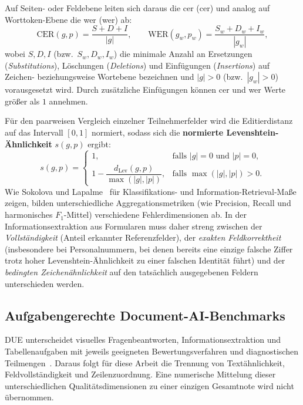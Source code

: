Auf Seiten- oder Feldebene leiten sich daraus die \acl{cer} (\ac{cer}) und analog auf Worttoken-Ebene die \acl{wer} (\ac{wer}) ab:
\begin{equation}
  \mathrm{CER}(g, p) = \frac{S + D + I}{|g|}, \qquad
  \mathrm{WER}(g_w, p_w) = \frac{S_w + D_w + I_w}{|g_w|},
  \label{eq:cer-wer}
\end{equation}
wobei $S, D, I$ (bzw.\ $S_w, D_w, I_w$) die minimale Anzahl an Ersetzungen (\emph{Substitutions}), Löschungen (\emph{Deletions}) und Einfügungen (\emph{Insertions}) auf Zeichen- beziehungsweise Wortebene bezeichnen und $|g| > 0$ (bzw.\ $|g_w| > 0$) vorausgesetzt wird. Durch zusätzliche Einfügungen können \ac{cer} und \ac{wer} Werte größer als $1$ annehmen.

Für den paarweisen Vergleich einzelner Teilnehmerfelder wird die Editierdistanz auf das Intervall $[0, 1]$ normiert, sodass sich die \textbf{normierte Levenshtein-Ähnlichkeit} $s(g, p)$ ergibt:
\begin{equation}
  s(g, p) = \begin{cases}
    1, & \text{falls } |g| = 0 \text{ und } |p| = 0, \\[4pt]
    1 - \dfrac{d_{\mathrm{Lev}}(g, p)}{\max(|g|, |p|)}, & \text{falls } \max(|g|, |p|) > 0.
  \end{cases}
  \label{eq:levenshtein-similarity}
\end{equation}
Wie Sokolova und Lapalme~\cite{Sokolova2009Measures} für Klassifikations- und Information-Retrieval-Maße zeigen, bilden unterschiedliche Aggregationsmetriken (wie Precision, Recall und harmonisches $F_1$-Mittel) verschiedene Fehlerdimensionen ab. In der Informationsextraktion aus Formularen muss daher streng zwischen der \emph{Vollständigkeit} (Anteil erkannter Referenzfelder), der \emph{exakten Feldkorrektheit} (insbesondere bei Personalnummern, bei denen bereits eine einzige falsche Ziffer trotz hoher Levenshtein-Ähnlichkeit zu einer falschen Identität führt) und der \emph{bedingten Zeichenähnlichkeit} auf den tatsächlich ausgegebenen Feldern unterschieden werden.

\subsection{Aufgabengerechte Document-AI-Benchmarks}
\label{subsec:benchmark-metriken}

DUE unterscheidet visuelles Fragenbeantworten, Informationsextraktion und Tabellenaufgaben mit jeweils geeigneten Bewertungsverfahren und diagnostischen Teilmengen~\cite{Borchmann2021DUE}. Daraus folgt für diese Arbeit die Trennung von Textähnlichkeit, Feldvollständigkeit und Zeilenzuordnung. Eine numerische Mittelung dieser unterschiedlichen Qualitätsdimensionen zu einer einzigen Gesamtnote wird nicht übernommen.

